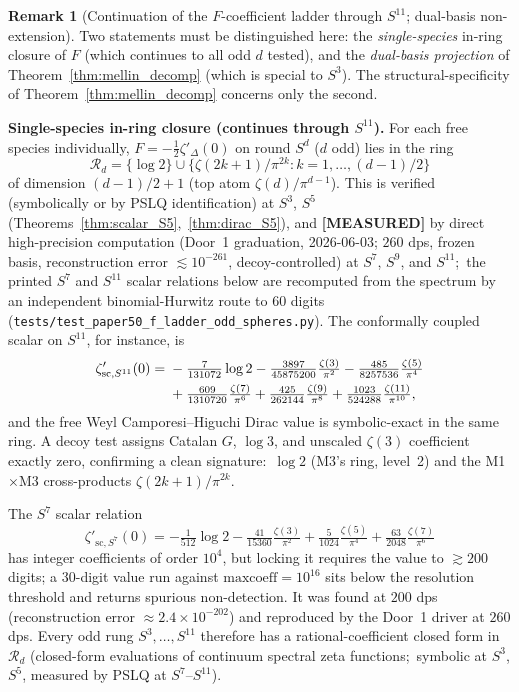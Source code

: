 \documentclass[11pt,a4paper]{article}
\theoremstyle{plain}
\theoremstyle{definition}
\newtheorem{remark}[theorem]{Remark}
\begin{document}
\begin{remark}[Continuation of the $F$-coefficient ladder through $S^{11}$; dual-basis non-extension]
\label{rem:general_d_conjecture}
Two statements must be distinguished here: the \emph{single-species}
in-ring closure of $F$ (which continues to all odd $d$ tested), and the
\emph{dual-basis projection} of Theorem~\ref{thm:mellin_decomp} (which is
special to $S^{3}$). The structural-specificity of
Theorem~\ref{thm:mellin_decomp} concerns only the second.

\textbf{Single-species in-ring closure (continues through $S^{11}$).}
For each free species individually, $F = -\tfrac{1}{2}\zeta'_{\Delta}(0)$
on round $S^{d}$ ($d$ odd) lies in the ring
\[
\mathcal{R}_{d} = \{\log 2\} \cup
\{\zeta(2k+1)/\pi^{2k} : k = 1, \dots, (d-1)/2\}
\]
of dimension $(d-1)/2 + 1$ (top atom $\zeta(d)/\pi^{d-1}$). This is
verified (symbolically or by PSLQ identification) at $S^{3}$, $S^{5}$
(Theorems~\ref{thm:scalar_S5},~\ref{thm:dirac_S5}), and
\textbf{[MEASURED]} by direct
high-precision computation (Door~1 graduation, 2026-06-03; $260$ dps,
frozen basis, reconstruction error $\lesssim 10^{-261}$, decoy-controlled)
at $S^{7}$, $S^{9}$, and $S^{11}$;\ the printed $S^{7}$ and $S^{11}$
scalar relations below are recomputed from the spectrum by an
independent binomial-Hurwitz route to $60$ digits
(\texttt{tests/test\_paper50\_f\_ladder\_odd\_spheres.py}). The conformally coupled scalar on
$S^{11}$, for instance, is
\begin{align}
\zeta'_{\mathrm{sc}, S^{11}}(0) =\;
&-\tfrac{7}{131072}\log 2
 -\tfrac{3897}{45875200}\tfrac{\zeta(3)}{\pi^{2}}
 -\tfrac{485}{8257536}\tfrac{\zeta(5)}{\pi^{4}} \notag\\
&+\tfrac{609}{1310720}\tfrac{\zeta(7)}{\pi^{6}}
 +\tfrac{425}{262144}\tfrac{\zeta(9)}{\pi^{8}}
 +\tfrac{1023}{524288}\tfrac{\zeta(11)}{\pi^{10}},
\end{align}
and the free Weyl Camporesi--Higuchi Dirac value is symbolic-exact in the
same ring. A decoy test assigns Catalan $G$, $\log 3$, and unscaled
$\zeta(3)$ coefficient exactly zero, confirming a clean signature:\
$\log 2$ (M3's ring, level~2) and the M1$\times$M3 cross-products
$\zeta(2k+1)/\pi^{2k}$.

The $S^{7}$ scalar relation
\[
\zeta'_{\mathrm{sc}, S^{7}}(0) =
-\tfrac{1}{512}\log 2
-\tfrac{41}{15360}\tfrac{\zeta(3)}{\pi^{2}}
+\tfrac{5}{1024}\tfrac{\zeta(5)}{\pi^{4}}
+\tfrac{63}{2048}\tfrac{\zeta(7)}{\pi^{6}}
\]
has integer coefficients of order $10^{4}$, but locking it requires the
value to $\gtrsim 200$ digits; a $30$-digit value run against
$\mathrm{maxcoeff} = 10^{16}$ sits below the resolution threshold and
returns spurious non-detection. It was found at $200$ dps
(reconstruction error $\approx 2.4 \times 10^{-202}$) and reproduced by the
Door~1 driver at $260$ dps. Every odd rung $S^{3}, \dots, S^{11}$
therefore has a rational-coefficient closed form in $\mathcal{R}_{d}$
(closed-form evaluations of continuum spectral zeta functions;\
symbolic at $S^{3}$, $S^{5}$, measured by PSLQ at $S^{7}$--$S^{11}$).


\end{remark}
\end{document}

